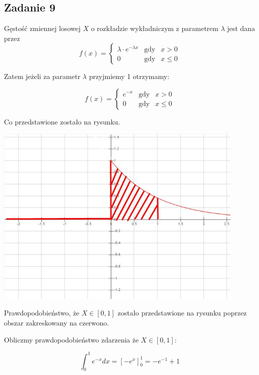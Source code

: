 \subsection{Zadanie 9}

Gęstość zmiennej losowej $X$ o rozkładzie wykładniczym z parametrem $\lambda$ jest dana przez 
$$
f(x) = \left\{
\begin{array}{lcr}
\lambda \cdot e^{-\lambda x} & \text{gdy} & x > 0\\
0 & \text{gdy} & x \leq 0
\end{array}
\right.
$$

Zatem jeżeli za parametr  $\lambda$  przyjmiemy 1 otrzymamy:

$$
f(x) = \left\{
\begin{array}{rcl}
e^{- x} & \text{gdy} & x > 0\\
0 & \text{gdy} & x \leq 0
\end{array}
\right.
$$
  
Co przedstawione zostało na rysunku.

\begin{center}
\includegraphics[width=12cm]{./tydzien_04/zad_09.png}
\end{center}

Prawdopodobieństwo, że  $X \in [0,1]$ zostało przedstawione na rysunku poprzez obszar zakreskowany na czerwono.

Obliczmy prawdopodobieństwo zdarzenia że $X \in [0,1]$:

$$
\int_{0}^{1} e^{- x} dx = [-e^x]_{0}^{1} = -e^{-1} + 1
$$
